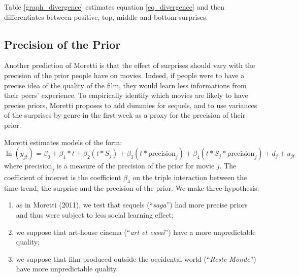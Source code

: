  Table \ref{graph_divergence} estimates equation \ref{eq_divergence} and then differentiates between positive, top, middle and bottom surprises. 
\subsection{Precision of the Prior}\label{subsec2.3}
Another prediction of Moretti is that the effect of surprises should vary with the precision of the prior people have on movies. Indeed, if people were to have a precise idea of the quality of the film, they would learn less informations from their peers' experience. To empirically identify which movies are likely to have precise priors, Moretti proposes to add dummies for sequels, and to use variances of the surprises by genre in the first week as a proxy for the precision of their prior. 

Moretti estimates models of the form: \begin{equation}\label{key}
	\ln(y_{jt})=\beta_0+\beta_1*t+\beta_2(t*S_j)+\beta_3(t*\text{precision}_j)+\beta_4(t*S_j*\text{precision}_j) +d_j+u_{jt}
\end{equation}
where $\text{precision}_j$ is a measure of the precision of the prior for movie $j$. The coefficient of interest is the coefficient $\beta_4$ on the triple interaction between the time trend, the surprise and the precision of the prior. We make three hypothesis: 
\begin{enumerate}
	\item as in Moretti (2011), we test that sequels (``\textit{saga}'') had more precise priors and thus were subject to less social learning effect;
	\item we suppose that art-house cinema (``\textit{art et essai}'') have a more unpredictable quality;
	\item we suppose that film produced outside the occidental world (``\textit{Reste Monde}'') have more unpredictable quality.
\end{enumerate}

